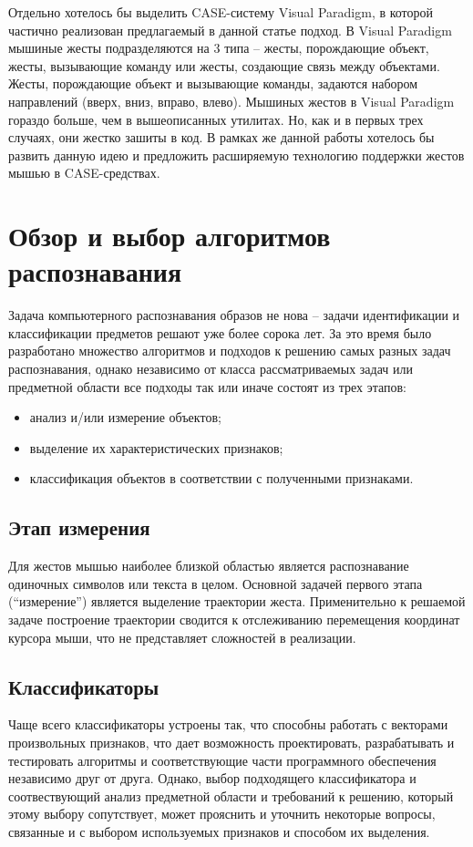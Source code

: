 \documentclass[a5paper]{article}
\begin{document}
Отдельно хотелось бы выделить CASE-систему Visual Paradigm, в которой частично реализован предлагаемый в данной статье подход. 
В Visual Paradigm мышиные жесты подразделяются на 3 типа – жесты, порождающие объект, жесты, вызывающие команду или жесты, 
создающие связь между объектами. Жесты, порождающие объект и вызывающие команды, задаются набором направлений (вверх, вниз, вправо, влево). 
Мышиных жестов в Visual Paradigm гораздо больше, чем в вышеописанных утилитах. Но, как и в первых трех случаях, они жестко
зашиты в код. В рамках же данной работы хотелось бы развить данную идею и предложить расширяемую технологию поддержки
жестов мышью в CASE-средствах.


\section{Обзор и выбор алгоритмов распознавания}
Задача компьютерного распознавания образов не нова -- задачи идентификации и классификации предметов решают уже более сорока лет. За это 
время было разработано множество алгоритмов и подходов к решению самых разных задач распознавания, однако независимо от класса 
рассматриваемых задач или предметной области все подходы так или иначе состоят из трех этапов: 
\begin{itemize}
  \item анализ и/или измерение объектов;
  \item выделение их характеристических признаков;
  \item классификация объектов в соответствии с полученными признаками.
\end{itemize}

\subsection{Этап измерения}
Для жестов мышью наиболее близкой областью является распознавание одиночных символов или текста в целом. Основной задачей первого этапа 
(``измерение'') является выделение траектории жеста. Применительно к решаемой задаче построение траектории сводится к отслеживанию 
перемещения координат курсора мыши, что не представляет сложностей в реализации. 

\subsection{Классификаторы}

Чаще всего классификаторы устроены так, что способны работать с векторами произвольных признаков, что дает возможность
проектировать, разрабатывать и тестировать алгоритмы и соответствующие части программного обеспечения независимо друг от друга. Однако, 
выбор подходящего классификатора и соотвествующий анализ предметной области и требований к решению, который этому выбору сопутствует, 
может прояснить и уточнить некоторые вопросы, связанные и с выбором используемых признаков и способом их выделения. 
\end{document}
